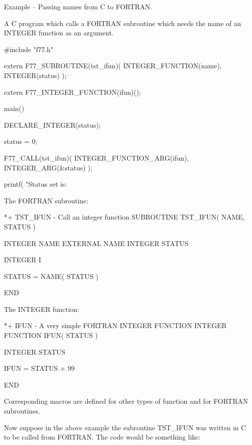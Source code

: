 \documentclass[twoside,11pt,nolof]{starlink}
\newcounter{examples}
\begin{document}
\label{cook_namectof}
\begin{center}
Example\latex{~\ref{cook_namectof}}
-- Passing names from C to FORTRAN.
\end{center}
A C program which calls a FORTRAN subroutine which needs the name of an INTEGER
function as an argument.
\begin{small}
\begin{terminalv}
#include "f77.h"

extern F77_SUBROUTINE(tst_ifun)( INTEGER_FUNCTION(name),
                                 INTEGER(status) );

extern F77_INTEGER_FUNCTION(ifun)();

main(){
DECLARE_INTEGER(status);

   status = 0;

   F77_CALL(tst_ifun)( INTEGER_FUNCTION_ARG(ifun),
                        INTEGER_ARG(&status) );

   printf( "Status set is: %

}
\end{terminalv}
\end{small}
The FORTRAN subroutine:
\begin{small}
\begin{terminalv}
*+ TST_IFUN - Call an integer function
      SUBROUTINE TST_IFUN( NAME, STATUS )

      INTEGER NAME
      EXTERNAL NAME
      INTEGER STATUS

      INTEGER I

      STATUS = NAME( STATUS )

      END
\end{terminalv}
\end{small}
The INTEGER function:
\begin{small}
\begin{terminalv}
*+ IFUN - A very simple FORTRAN INTEGER FUNCTION
      INTEGER FUNCTION IFUN( STATUS )

      INTEGER STATUS

      IFUN = STATUS + 99

      END
\end{terminalv}
\end{small}
Corresponding macros are defined for other types of function and for
FORTRAN subroutines.

Now suppose in the above example the subroutine TST\_IFUN was written in C to
be called from FORTRAN. The code would be something like:
\end{document}
